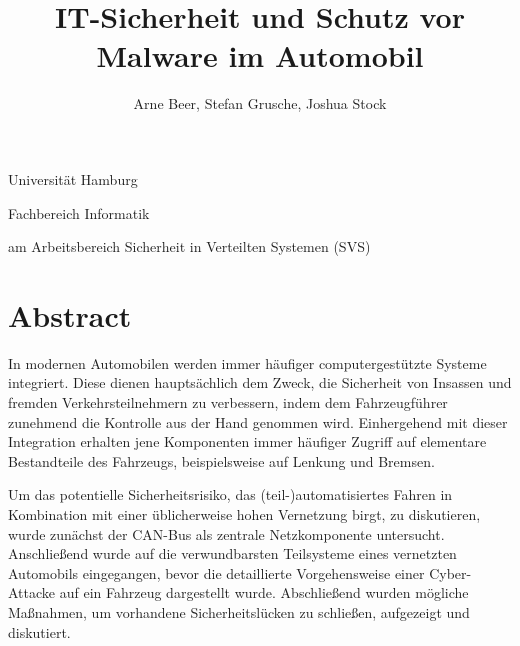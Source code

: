 \documentclass[
    fontsize=12pt,
    headings=small,
    parskip=half,           %
    bibliography=totoc,
    numbers=noenddot,       %
    open=any,               %
    ]{scrreprt}
\title{IT-Sicherheit und Schutz vor Malware im Automobil}
\author{Arne Beer, Stefan Grusche, Joshua Stock}
\begin{document}
\begin{titlepage}
\begin{center}\Large
    Universität Hamburg \par
    Fachbereich Informatik
    \vfill
    \makeatletter
    {\Large\textsf{\textbf{\@title}}\par}
    \makeatother
    \bigskip
    am Arbeitsbereich Sicherheit in Verteilten Systemen (SVS) \par
    \bigskip
    \makeatletter
    {\@author} \par
    \makeatother
    \bigskip
    \makeatletter
    {\@date}
    \makeatother
    \vfill
    \vfill
\end{center}
\end{titlepage}




\chapter*{Abstract}
In modernen Automobilen werden immer häufiger computergestützte Systeme integriert. Diese dienen hauptsächlich dem Zweck, die Sicherheit von Insassen und fremden Verkehrsteilnehmern zu verbessern, indem dem Fahrzeugführer zunehmend die Kontrolle aus der Hand genommen wird. Einhergehend mit dieser Integration erhalten jene Komponenten immer häufiger Zugriff auf elementare Bestandteile des Fahrzeugs, beispielsweise auf Lenkung und Bremsen. \par
Um das potentielle Sicherheitsrisiko, das (teil-)automatisiertes Fahren in Kombination mit einer üblicherweise hohen Vernetzung birgt, zu diskutieren, wurde zunächst der CAN-Bus als zentrale Netzkomponente untersucht. Anschließend wurde auf die verwundbarsten Teilsysteme eines vernetzten Automobils eingegangen, bevor die detaillierte Vorgehensweise einer Cyber-Attacke auf ein Fahrzeug dargestellt wurde. Abschließend wurden mögliche Maßnahmen, um vorhandene Sicherheitslücken zu schließen, aufgezeigt und diskutiert.

\tableofcontents
\end{document}
